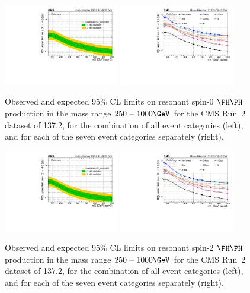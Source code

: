 \begin{figure}
  \centering
  \includegraphics[width=0.45\textwidth]{figures/massScan_spin0_multilepton_RUN2.pdf}
  \hspace{0.05\textwidth}
  \includegraphics[width=0.45\textwidth]{figures/massMultiScan_spin0_multilepton_Run2.pdf}
  \caption{
    Observed and expected 95\% CL limits on resonant spin-0 $\HH$ production in
    the mass range $250 - 1000\GeV$ for the CMS Run~2 dataset of 137.2\fbinv,
    for the combination of all event categories (left),
    and for each of the seven event categories separately (right).
  }
  \label{fig:HH_limits_spin0}
\end{figure}

\begin{figure}
  \centering
  \includegraphics[width=0.45\textwidth]{figures/massScan_spin2_multilepton_RUN2.pdf}
  \hspace{0.05\textwidth}
  \includegraphics[width=0.45\textwidth]{figures/massMultiScan_spin2_multilepton_Run2.pdf}
  \caption{
    Observed and expected 95\% CL limits on resonant spin-2 $\HH$ production in
    the mass range $250 - 1000\GeV$ for the CMS Run~2 dataset of 137.2\fbinv,
    for the combination of all event categories (left),
    and for each of the seven event categories separately (right).
  }
  \label{fig:HH_limits_spin2}
\end{figure}
